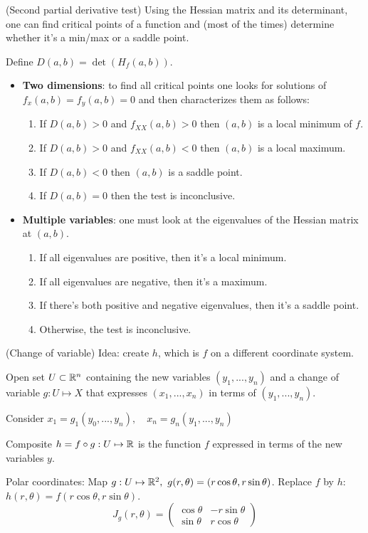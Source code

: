 \begin{definition}{(Second partial derivative test)}
    Using the Hessian matrix and its determinant, one can find critical points of a function and
    (most of the times) determine whether it's a min/max or a saddle point.

    Define $D(a, b) = \det(H_f(a,b))$.

\begin{itemize}
    \item \textbf{Two dimensions}: to find all critical points one looks for solutions of $f_x(a,b) = f_y(a,b) = 0$
    and then characterizes them as follows:
    \begin{enumerate}
        \item If $D(a,b) > 0$ and $f_{XX}(a,b) > 0$ then $(a,b)$ is a local minimum of $f$.
        \item If $D(a,b) > 0$ and $f_{XX}(a,b) < 0$ then $(a,b)$ is a local maximum.
        \item If $D(a,b) < 0$ then $(a,b)$ is a saddle point.
        \item If $D(a,b) = 0$ then the test is inconclusive.
    \end{enumerate}
    
    \item \textbf{Multiple variables}: one must look at the eigenvalues of the Hessian matrix at $(a,b)$.
    \begin{enumerate}
        \item If all eigenvalues are positive, then it's a local minimum.
        \item If all eigenvalues are negative, then it's a maximum.
        \item If there's both positive and negative eigenvalues, then it's a saddle point.
        \item Otherwise, the test is inconclusive.
    \end{enumerate}
\end{itemize}
    
    
\end{definition}

\begin{example}{(Change of variable)}
    Idea: create $h$, which is $f$ on a different coordinate system.

    Open set $U \subset \mathbb{R}^n$ containing the new variables $(y_1, ..., y_n)$ and a change of variable $g: U \mapsto X$
    that expresses $(x_1, ..., x_n)$ in terms of $(y_1, ..., y_n)$.

    Consider $x_1 = g_1(y_0, ..., y_n),\quad x_n = g_n(y_1, ..., y_n)$

    Composite $h = f \circ g: U \mapsto \mathbb{R}$ is the function $f$ expressed in terms of the new variables $y$.

    Polar coordinates: Map $g: U \mapsto \R^2,\ g(r, \theta) = (r \cos \theta, r \sin \theta)$.
    Replace $f$ by $h$: $h(r, \theta) = f(r \cos \theta, r \sin \theta)$.
    \[ J_g(r, \theta) = \begin{pmatrix}
            \cos \theta & - r \sin \theta \\
            \sin \theta & r \cos \theta
        \end{pmatrix} \]
\end{example}

